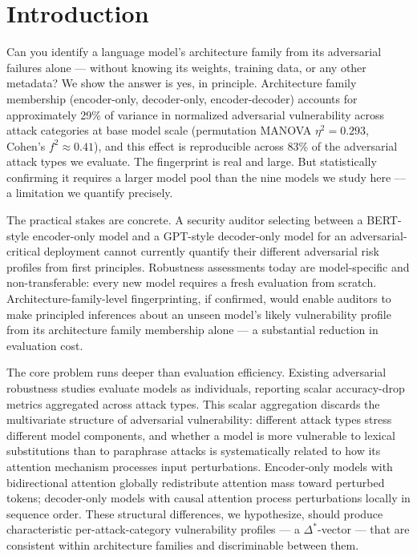 \section{Introduction}

Can you identify a language model's architecture family from its adversarial failures alone ---
without knowing its weights, training data, or any other metadata? We show the answer is yes,
in principle. Architecture family membership (encoder-only, decoder-only, encoder-decoder) accounts
for approximately 29\% of variance in normalized adversarial vulnerability across attack categories
at base model scale (permutation MANOVA $\eta^2=0.293$, Cohen's $f^2 \approx 0.41$), and this effect
is reproducible across 83\% of the adversarial attack types we evaluate. The fingerprint is real
and large. But statistically confirming it requires a larger model pool than the nine models we
study here --- a limitation we quantify precisely.

The practical stakes are concrete. A security auditor selecting between a BERT-style encoder-only
model and a GPT-style decoder-only model for an adversarial-critical deployment cannot currently
quantify their different adversarial risk profiles from first principles. Robustness assessments
today are model-specific and non-transferable: every new model requires a fresh evaluation from
scratch. Architecture-family-level fingerprinting, if confirmed, would enable auditors to make
principled inferences about an unseen model's likely vulnerability profile from its architecture
family membership alone --- a substantial reduction in evaluation cost.

The core problem runs deeper than evaluation efficiency. Existing adversarial robustness studies
evaluate models as individuals, reporting scalar accuracy-drop metrics aggregated across attack types.
This scalar aggregation discards the multivariate structure of adversarial vulnerability: different
attack types stress different model components, and whether a model is more vulnerable to lexical
substitutions than to paraphrase attacks is systematically related to how its attention mechanism
processes input perturbations. Encoder-only models with bidirectional attention globally redistribute
attention mass toward perturbed tokens; decoder-only models with causal attention process perturbations
locally in sequence order. These structural differences, we hypothesize, should produce characteristic
per-attack-category vulnerability profiles --- a $\Delta^*$-vector --- that are consistent within
architecture families and discriminable between them.

